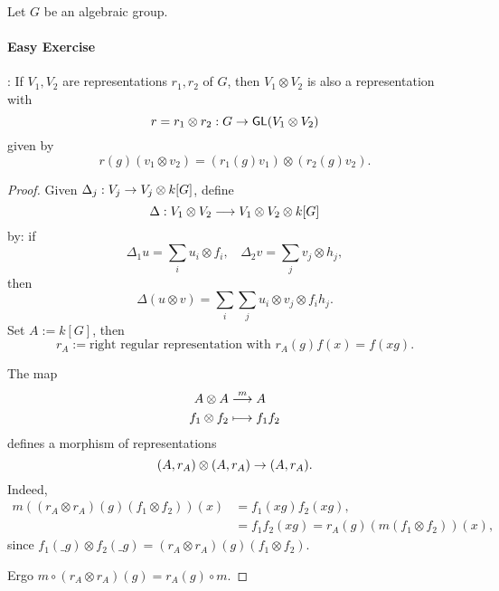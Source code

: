Let $G$ be an algebraic group.
\paragraph{Easy Exercise}: If $V_1,V_2$ are representations $r_1,r_2$ of $G$, then $V_1\otimes V_2$ is also a representation with
\[ r = r_1 \otimes r_2: G \overset{}{\rightarrow} \textsf{GL}(V_1 \otimes V_2) \]
given by
\[ r(g)(v_1 \otimes v_2) = (r_1(g)v_1) \otimes (r_2(g) v_2).  \]
\begin{proof}
	Given $\Delta_j : V_j \overset{}{\rightarrow} V_j \otimes k[G]$, define
	\[\Delta : V_1\otimes V_2 \overset{}{\longrightarrow} V_1 \otimes V_2 \otimes k[G]\]
	by:
	if
	\[ \Delta_1 u = \sum_i u_i \otimes f_i, ~~~~ \Delta_2 v = \sum_j v_j \otimes h_j, \]
	then
	\[ \Delta(u\otimes v) =\sum_i \sum_j u_i \otimes v_j \otimes f_i h_j. \]
	Set $A := k[G]$, then
	\[ r_A := \text{right regular representation with } r_A(g) f(x) = f(xg). \]
	
	The map
	\begin{align*}
	A \otimes A &\overset{m}{\longrightarrow} A\\
	f_1 \otimes f_2 &\longmapsto f_1f_2
	\end{align*}
	defines a morphism of representations
	\[ (A, r_A) \otimes (A, r_A) \overset{}{\rightarrow} (A, r_A). \]
	Indeed,
	\begin{align*}
	m((r_A \otimes r_A)(g)(f_1 \otimes f_2))(x) &= f_1(xg)f_2(xg),\\
	&= f_1f_2(xg) = r_A(g)(m(f_1 \otimes f_2))(x),
	\end{align*}
	since $f_1(\_ g) \otimes f_2(\_ g) = (r_A \otimes r_A)(g)(f_1 \otimes f_2)$.
	
	Ergo $m \circ (r_A \otimes r_A)(g) = r_A(g) \circ m$.
\end{proof}


